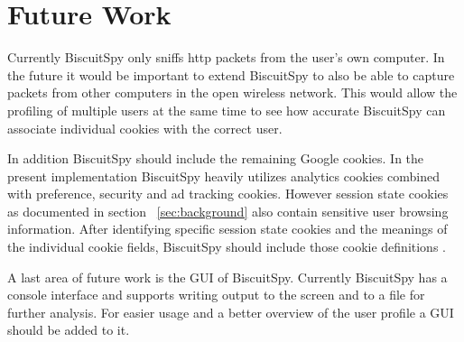 \section{Future Work}
\label{sec:future}

Currently BiscuitSpy only sniffs http packets from the user's own computer. In the future it would be important to extend BiscuitSpy to also be able to capture packets from other computers in the open wireless network. This would allow the profiling of multiple users at the same time to see how accurate BiscuitSpy can associate individual cookies with the correct user.

In addition BiscuitSpy should include the remaining Google cookies. In the present implementation BiscuitSpy heavily utilizes analytics cookies combined with preference, security and ad tracking cookies. However session state cookies as documented in section ~\ref{sec:background} also contain sensitive user browsing information. After identifying specific session state cookies and the meanings of the individual cookie fields, BiscuitSpy should include those cookie definitions .

A last area of future work is the GUI of BiscuitSpy. Currently BiscuitSpy has a console interface and supports writing output to the screen and to a file for further analysis. For easier usage and a better overview of the user profile a GUI should be added to it.